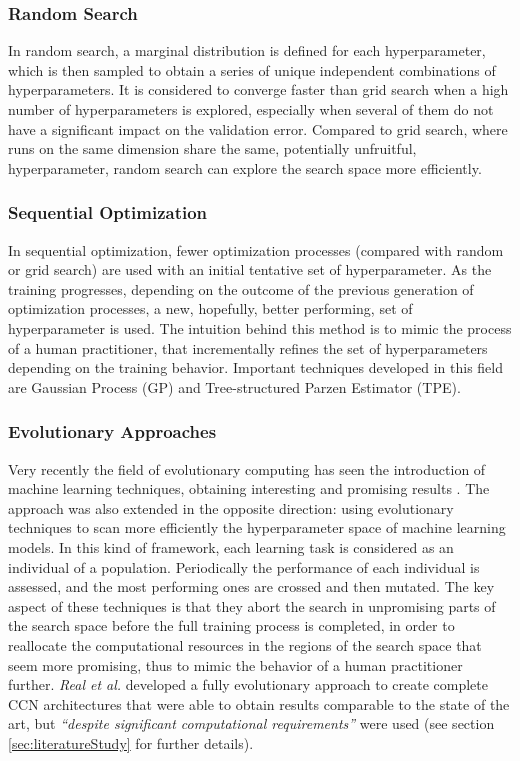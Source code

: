 \documentclass{article}
\begin{document}
	\subsubsection*{Random Search}
	In random search, a marginal distribution is defined for each hyperparameter, which is then sampled to obtain a series of unique independent combinations of hyperparameters. It is considered to converge faster than grid search when a high number of hyperparameters is explored\cite{Bergstra:2012:RSH:2188385.2188395}, especially when several of them do not have a significant impact on the validation error. Compared to grid search, where runs on the same dimension share the same, potentially unfruitful, hyperparameter, random search can explore the search space more efficiently.
	
	\subsubsection*{Sequential Optimization}
	In sequential optimization, fewer optimization processes (compared with random or grid search) are used with an initial tentative set of hyperparameter. As the training progresses, depending on the outcome of the previous generation of optimization processes, a new, hopefully, better performing, set of hyperparameter is used. The intuition behind this method is to mimic the process of a human practitioner, that incrementally refines the set of hyperparameters depending on the training behavior.
	Important techniques developed in this field are  Gaussian Process (GP) and Tree-structured Parzen Estimator (TPE)\cite{Bergstra:2011:AHO:2986459.2986743}.
	
	\subsubsection*{Evolutionary Approaches}
	Very recently the field of evolutionary computing has seen the introduction of machine learning techniques, obtaining interesting and promising results \cite{Zhang:2011:ECM:2772968.2773017}\cite{XueZhang2016}. The approach was also extended in the opposite direction: using evolutionary techniques to scan more efficiently the hyperparameter space of machine learning models\cite{pmlr-v70-real17a}. In this kind of framework, each learning task is considered as an individual of a population. Periodically the performance of each individual is assessed, and the most performing ones are crossed and then mutated. The key aspect of these techniques is that they abort the search in unpromising parts of the search space before the full training process is completed, in order to reallocate the computational resources in the regions of the search space that seem more promising, thus to mimic the behavior of a human practitioner further.
	\textit{Real et al.}\cite{pmlr-v70-real17a} developed a fully evolutionary approach to create complete CCN architectures that were able to obtain results comparable to the state of the art, but \textit{``despite significant computational requirements''} were used (see section \ref{sec:literatureStudy} for further details). 
	
\end{document}
